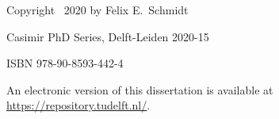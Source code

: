\begin{titlepage}
\vspace{4\bigskipamount}

\noindent Copyright \textcopyright\ 2020 by Felix E.~Schmidt

\noindent Casimir PhD Series, Delft-Leiden 2020-15

\medskip
\noindent ISBN 978-90-8593-442-4

\medskip
\noindent An electronic version of this dissertation is available at \\
\url{https://repository.tudelft.nl/}.

\end{titlepage}

